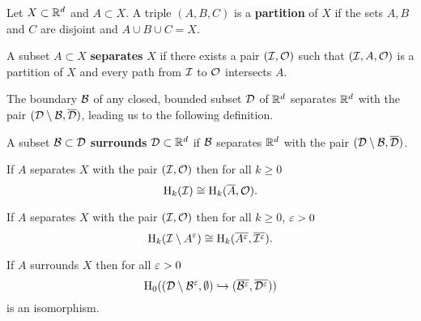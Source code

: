 
Let $X\subset \mathbb{R}^d$ and $A\subset X$.
A triple $(A,B,C)$ is a \textbf{partition} of $X$ if the sets $A, B$ and $C$ are disjoint and $A\cup B\cup C = X$.
\begin{definition}
    A subset $A\subset X$ \textbf{separates} $X$ if there exists a pair $({\mathcal{I}},\mathcal{O})$ such that $({\mathcal{I}}, A, \mathcal{O})$ is a partition of $X$ and every path from ${\mathcal{I}}$ to $\mathcal{O}$ intersects $A$.
\end{definition}
The boundary ${\mathcal{B}}$ of any closed, bounded subset ${\mathcal{D}}$ of $\mathbb{R}^d$ separates $\mathbb{R}^d$ with the pair $({\mathcal{D}}\setminus{\mathcal{B}}, \overline{{\mathcal{D}}})$, leading us to the following definition.
\begin{definition}
    A subset ${\mathcal{B}}\subset {\mathcal{D}}$ \textbf{surrounds} ${\mathcal{D}}\subset\mathbb{R}^d$ if ${\mathcal{B}}$ separates $\mathbb{R}^d$ with the pair $({\mathcal{D}}\setminus{\mathcal{B}}, \overline{{\mathcal{D}}})$.
\end{definition}

\begin{lemma}
    If $A$ separates $X$ with the pair $({\mathcal{I}}, \mathcal{O})$ then for all $k\geq 0$
    \[ \mathrm{H}_k({\mathcal{I}})\cong\mathrm{H}_k(\overline{A}, \mathcal{O}). \]
\end{lemma}
%
%

\begin{lemma}\label{lem:surrounds}
    If $A$ separates $X$ with the pair $({\mathcal{I}}, \mathcal{O})$ then for all $k\geq 0$, $\varepsilon > 0$
    \[\mathrm{H}_k({\mathcal{I}}\setminus A^\varepsilon)\cong \mathrm{H}_k(\overline{A^\varepsilon}, \overline{{\mathcal{I}}^\varepsilon}).\]
\end{lemma}

\begin{lemma}\label{lem:surrounds}
    If $A$ surrounds $X$ then for all $\varepsilon > 0$
    \[\mathrm{H}_0(({\mathcal{D}}\setminus{\mathcal{B}}^\varepsilon,\emptyset)\hookrightarrow (\overline{{\mathcal{B}}^\varepsilon}, \overline{{\mathcal{D}}^\varepsilon}))\]
    is an isomorphism.
\end{lemma}

